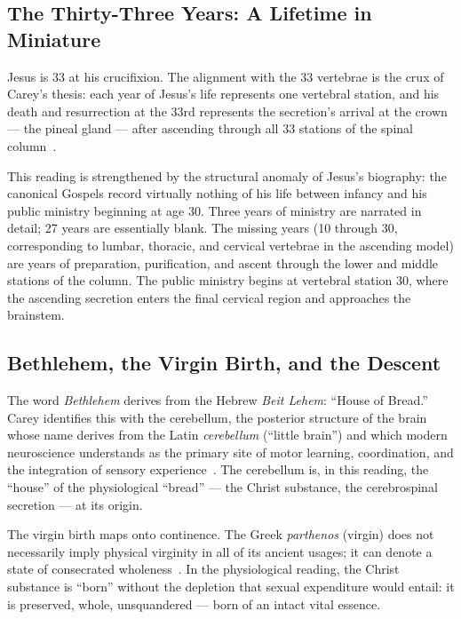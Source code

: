 \documentclass[12pt, a4paper]{article}
\begin{document}
\subsection{The Thirty-Three Years: A Lifetime in Miniature}

Jesus is 33 at his crucifixion. The alignment with the 33 vertebrae is the
crux of Carey's thesis: each year of Jesus's life represents one vertebral
station, and his death and resurrection at the 33rd represents the
secretion's arrival at the crown — the pineal gland — after ascending through
all 33 stations of the spinal
column~\autocite[67]{carey1920}.

This reading is strengthened by the structural anomaly of Jesus's biography:
the canonical Gospels record virtually nothing of his life between infancy and
his public ministry beginning at age 30. Three years of ministry are narrated
in detail; 27 years are essentially blank. The missing years (10 through 30,
corresponding to lumbar, thoracic, and cervical vertebrae in the ascending
model) are years of preparation, purification, and ascent through the lower
and middle stations of the column. The public ministry begins at vertebral
station 30, where the ascending secretion enters the final cervical region
and approaches the brainstem.

\subsection{Bethlehem, the Virgin Birth, and the Descent}

The word \emph{Bethlehem} derives from the Hebrew \emph{Beit Lehem}: ``House
of Bread.'' Carey identifies this with the cerebellum, the posterior structure
of the brain whose name derives from the Latin \emph{cerebellum} (``little
brain'') and which modern neuroscience understands as the primary site of
motor learning, coordination, and the integration of sensory
experience~\autocite[889]{gray2016}. The cerebellum is, in this reading, the
``house'' of the physiological ``bread'' — the Christ substance, the
cerebrospinal secretion — at its origin.

The virgin birth maps onto continence. The Greek \emph{parthenos} (virgin)
does not necessarily imply physical virginity in all of its ancient usages;
it can denote a state of consecrated wholeness~\autocite[117]{steiner1902}.
In the physiological reading, the Christ substance is ``born'' without the
depletion that sexual expenditure would entail: it is preserved, whole,
unsquandered — born of an intact vital essence.
\end{document}
